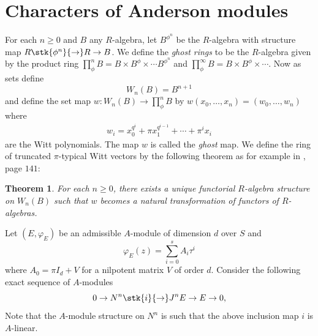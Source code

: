 \documentclass{amsart}
\newtheorem {theorem} {\bf{Theorem}}[section]
\numberwithin {equation}{section}
\newcommand{\map}{\rightarrow}
\begin{document}
\section{Characters of Anderson modules}

For each $n \geq 0$ and $B$ any $R$-algebra, let $B^{\phi^n}$ be the $R$-algebra
with structure map $R \stk{\phi^n}{\map} R \map B$. We define the {\it ghost
rings} to be the $R$-algebra given by the product ring $\prod_\phi^n B =
B \times B^\phi \times \cdots B^{\phi^n}$ and $\prod_\phi^\infty B = B \times
B^\phi \times \cdots $. Now as sets define 
$$
W_n(B) = B^{n+1}
$$
and define the set map $w:W_n(B) \map \prod_\phi^n B$ by $w(x_0,\dots, x_n)
= (w_0,\dots, w_n)$ where 
\begin{align}
w_i = x_0^{q^i} + \pi x_1^{q^{i-1}}+ \cdots + \pi^i x_i
\end{align}
are the Witt polynomials. The map $w$ is called the {\it ghost} map.
We define the ring of truncated $\pi$-typical Witt vectors by the following 
theorem as for example in \cite{hessl05}, page $141$:
\begin{theorem}
For each $n\geq 0$, there exists a unique functorial $R$-algebra structure on 
$W_n(B)$ such that $w$ becomes a natural transformation of functors of 
$R$-algebras.
\end{theorem}

Let $(E,\varphi_{E})$ be an admissible $A$-module of dimension $d$ over $S$ and
 $$\varphi_{E}(z)=\displaystyle{\sum_{i=0}^{s}}A_{i}{\tau}^{i}$$
 where $A_{0}=\pi I_{d}+V$ for a nilpotent matrix $V$ of order $d$.
Consider the following exact sequence of $A$-modules
\begin{equation}\label{exact}
0\rightarrow N^{n}\stk{i}{\rightarrow} J^{n}E\rightarrow E\rightarrow 0,
\end{equation}  Note that the $A$-module structure on $N^{n}$ is such that the above  inclusion map $i$ is $A$-linear. 
\end{document}
